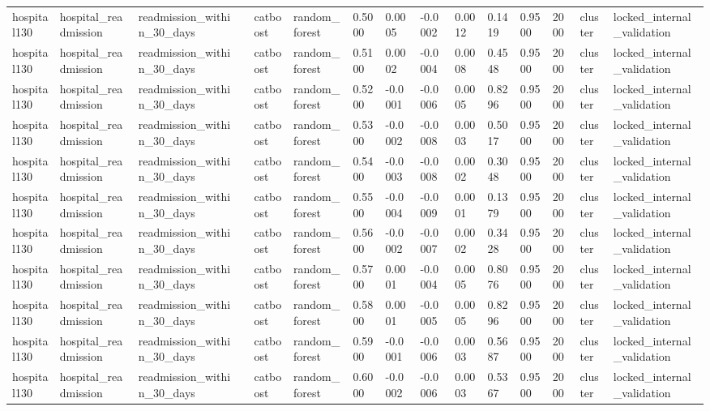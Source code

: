\begin{tabular}{lllllllllllllll}
hospital130 & hospital\_readmission & readmission\_within\_30\_days &  & catboost & random\_forest & 0.5000 & 0.0005 & -0.0002 & 0.0012 & 0.1419 & 0.9500 & 2000 & cluster & locked\_internal\_validation \\
hospital130 & hospital\_readmission & readmission\_within\_30\_days &  & catboost & random\_forest & 0.5100 & 0.0002 & -0.0004 & 0.0008 & 0.4548 & 0.9500 & 2000 & cluster & locked\_internal\_validation \\
hospital130 & hospital\_readmission & readmission\_within\_30\_days &  & catboost & random\_forest & 0.5200 & -0.0001 & -0.0006 & 0.0005 & 0.8296 & 0.9500 & 2000 & cluster & locked\_internal\_validation \\
hospital130 & hospital\_readmission & readmission\_within\_30\_days &  & catboost & random\_forest & 0.5300 & -0.0002 & -0.0008 & 0.0003 & 0.5017 & 0.9500 & 2000 & cluster & locked\_internal\_validation \\
hospital130 & hospital\_readmission & readmission\_within\_30\_days &  & catboost & random\_forest & 0.5400 & -0.0003 & -0.0008 & 0.0002 & 0.3048 & 0.9500 & 2000 & cluster & locked\_internal\_validation \\
hospital130 & hospital\_readmission & readmission\_within\_30\_days &  & catboost & random\_forest & 0.5500 & -0.0004 & -0.0009 & 0.0001 & 0.1379 & 0.9500 & 2000 & cluster & locked\_internal\_validation \\
hospital130 & hospital\_readmission & readmission\_within\_30\_days &  & catboost & random\_forest & 0.5600 & -0.0002 & -0.0007 & 0.0002 & 0.3428 & 0.9500 & 2000 & cluster & locked\_internal\_validation \\
hospital130 & hospital\_readmission & readmission\_within\_30\_days &  & catboost & random\_forest & 0.5700 & 0.0001 & -0.0004 & 0.0005 & 0.8076 & 0.9500 & 2000 & cluster & locked\_internal\_validation \\
hospital130 & hospital\_readmission & readmission\_within\_30\_days &  & catboost & random\_forest & 0.5800 & 0.0001 & -0.0005 & 0.0005 & 0.8296 & 0.9500 & 2000 & cluster & locked\_internal\_validation \\
hospital130 & hospital\_readmission & readmission\_within\_30\_days &  & catboost & random\_forest & 0.5900 & -0.0001 & -0.0006 & 0.0003 & 0.5687 & 0.9500 & 2000 & cluster & locked\_internal\_validation \\
hospital130 & hospital\_readmission & readmission\_within\_30\_days &  & catboost & random\_forest & 0.6000 & -0.0002 & -0.0006 & 0.0003 & 0.5367 & 0.9500 & 2000 & cluster & locked\_internal\_validation \\

\end{tabular}

